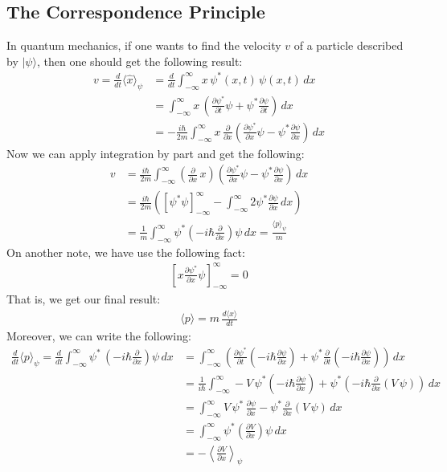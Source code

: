 \documentclass[11pt]{book}
\theoremstyle{break}
\theoremstyle{break}
\newcommand{\pd}{\partial}
\begin{document}
\subsection{The Correspondence Principle}
In quantum mechanics, if one wants to find the velocity $v$ of a particle described by $|\psi\rangle$, then one should get the following result:
\begin{align*}
v = \frac{d}{dt}\langle \hat{x}\rangle_{\psi} &= \frac{d}{dt}\int_{-\infty}^\infty x \, \psi^*(x,t)\, \psi(x,t)\, dx \\
&= \int_{-\infty}^\infty x\, \left( \frac{\pd \psi^*}{\pd t}\psi + \psi^* \frac{\pd \psi}{\pd t}\right)\, dx\\
&= -\frac{i\hbar}{2m}\int_{-\infty}^\infty x\, \frac{\pd}{\pd x}\left( \frac{\pd \psi^*}{\pd x}\psi - \psi^* \frac{\pd \psi}{\pd x}\right)\, dx
\end{align*}
Now we can apply integration by part and get the following:
\begin{align*}
v &= \frac{i\hbar}{2m}\int_{-\infty}^\infty  \left(\frac{\pd}{\pd x}\, x\right)\left( \frac{\pd \psi^*}{\pd x}\psi - \psi^* \frac{\pd \psi}{\pd x}\right)\, dx\\
&= \frac{i\hbar}{2m}\left( \left[\psi^*\psi\right]_{-\infty}^\infty  - \int_{-\infty}^\infty 2\psi^* \frac{\pd \psi}{\pd x}\, dx\right)\\
&= \frac{1}{m}\int_{-\infty}^\infty \psi^* \left( - i\hbar \frac{\pd}{\pd x}\right) \psi \, dx
= \frac{\langle p\rangle_{\psi}}{m}
\end{align*}
On another note, we have use the following fact:
\begin{align*}
\left[ x \frac{\pd \psi^*}{\pd x}\psi\right]_{-\infty}^\infty = 0
\end{align*}
That is, we get our final result:
\begin{align*}
\langle p \rangle =m\, \frac{d\langle x\rangle}{dt}
\end{align*}
Moreover, we can write the following:
\begin{align*}
\frac{d}{dt}\langle p \rangle_{\psi} = \frac{d}{dt}\int_{-\infty}^\infty \psi^*\, \left( -i\hbar\frac{\pd }{\pd x} \right) \psi\, dx &= \int_{-\infty}^\infty \left( \frac{\pd \psi^*}{\pd t}\left( -i\hbar \frac{\pd \psi}{\pd x} \right) + \psi^* \frac{\pd}{\pd t}\left(- i\hbar \frac{\pd \psi}{\pd x}\right)\right)\, dx\\
&= \frac{1}{i\hbar} \int_{-\infty}^\infty -V\, \psi^*\left( -i\hbar \frac{\pd \psi}{\pd x}\right) + \psi^* \left( -i\hbar \frac{\pd}{\pd x} \left( V\, \psi \right)\right)\, dx\\
&= \int_{-\infty}^\infty V \, \psi^*\,\frac{\pd\psi}{\pd x} - \psi^* \frac{\pd}{\pd x}(V\, \psi) \, dx\\
&= \int_{-\infty}^\infty \psi^* \left( \frac{\pd V}{\pd x}\right) \psi \, dx \\
&= -\left\langle \frac{\pd V}{\pd x}\right\rangle_{\psi}
\end{align*}
\end{document}

